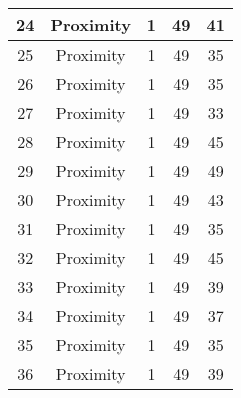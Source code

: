\documentclass[results.tex]{subfiles}
\begin{document}
\begin{center}
\begin{tabular}{| c || c | c | c | c |}
            \hline
            24                      & Proximity                    & 1                      & 49                      & 41                   \\
            \hline
            25                      & Proximity                    & 1                      & 49                      & 35                   \\
            \hline
            26                      & Proximity                    & 1                      & 49                      & 35                   \\
            \hline
            27                      & Proximity                    & 1                      & 49                      & 33                   \\
            \hline
            28                      & Proximity                    & 1                      & 49                      & 45                   \\
            \hline
            29                      & Proximity                    & 1                      & 49                      & 49                   \\
            \hline
            30                      & Proximity                    & 1                      & 49                      & 43                   \\
            \hline
            31                      & Proximity                    & 1                      & 49                      & 35                   \\
            \hline
            32                      & Proximity                    & 1                      & 49                      & 45                   \\
            \hline
            33                      & Proximity                    & 1                      & 49                      & 39                   \\
            \hline
            34                      & Proximity                    & 1                      & 49                      & 37                   \\
            \hline
            35                      & Proximity                    & 1                      & 49                      & 35                   \\
            \hline
            36                      & Proximity                    & 1                      & 49                      & 39                   \\

\end{tabular}
\end{center}
\end{document}
